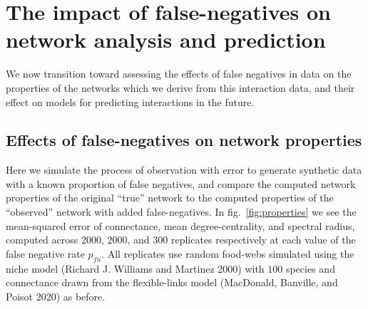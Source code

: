 \documentclass[11pt]{article}
\begin{document}
\hypertarget{the-impact-of-false-negatives-on-network-analysis-and-prediction}{%
\section{The impact of false-negatives on network analysis and
prediction}\label{the-impact-of-false-negatives-on-network-analysis-and-prediction}}

We now transition toward assessing the effects of false negatives in
data on the properties of the networks which we derive from this
interaction data, and their effect on models for predicting interactions
in the future.

\hypertarget{effects-of-false-negatives-on-network-properties}{%
\subsection{Effects of false-negatives on network
properties}\label{effects-of-false-negatives-on-network-properties}}

Here we simulate the process of observation with error to generate
synthetic data with a known proportion of false negatives, and compare
the computed network properties of the original ``true'' network to the
computed properties of the ``observed'' network with added
false-negatives. In fig.~\ref{fig:properties} we see the mean-squared
error of connectance, mean degree-centrality, and spectral radius,
computed across 2000, 2000, and 300 replicates respectively at each
value of the false negative rate \(p_{fn}\). All replicates use random
food-webs simulated using the niche model (Richard J. Williams and
Martinez 2000) with \(100\) species and connectance drawn from the
flexible-links model (MacDonald, Banville, and Poisot 2020) as before.
\end{document}
